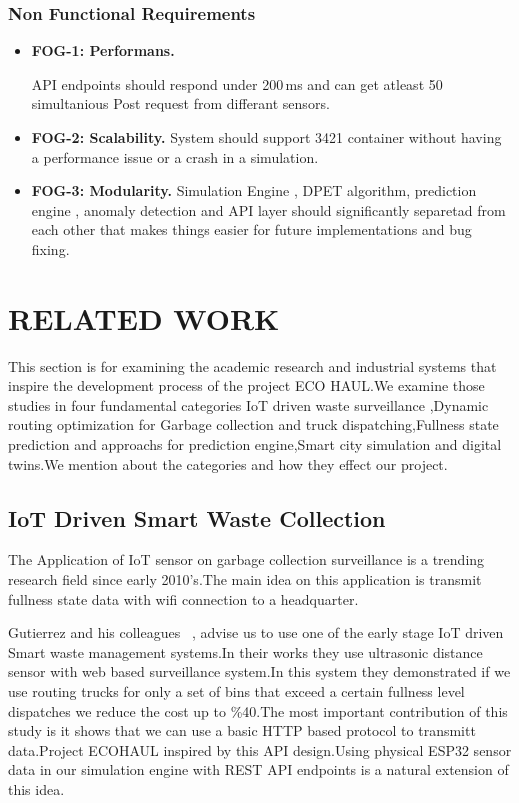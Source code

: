 \documentclass[12pt,a4paper]{report}
\begin{document}
\subsection{Non Functional Requirements}

\begin{itemize}[leftmargin=1.5cm]
  \item \textbf{FOG-1: Performans.}

        \indent API endpoints should respond under 200\,ms and can get atleast 50 simultanious Post request from differant sensors.
        \clearpage
  \item \textbf{FOG-2: Scalability.}
        System should support 3421 container without having a performance issue or a crash in a simulation.
  \item \textbf{FOG-3: Modularity.}
        \indent Simulation Engine , DPET algorithm, prediction engine , anomaly detection and API layer should significantly separetad from each other that makes things easier for future implementations and bug fixing.

\end{itemize}

\chapter{RELATED WORK}

\indent This section is for examining the academic research and industrial systems that inspire the development process of the project ECO HAUL.We examine those studies in four fundamental categories IoT driven waste surveillance ,Dynamic routing optimization for Garbage collection and truck dispatching,Fullness state prediction and approachs for prediction engine,Smart city simulation and digital twins.We mention about the categories and how they effect our project.
\section{IoT Driven Smart Waste Collection}

\indent The Application of IoT sensor on garbage collection surveillance is a trending research field since early 2010's.The main idea on this application is transmit fullness state data with  wifi connection to a headquarter.

\indent Gutierrez and his colleagues ~\cite{gutierrez2015}, advise us to use one of the early stage IoT driven Smart waste  management systems.In their works they use ultrasonic distance sensor with web based surveillance system.In this system they demonstrated if we use routing trucks for only a set of bins that exceed a certain fullness level dispatches we reduce the cost up to  \%40.The most important contribution of this study is it shows that we can use a basic HTTP based protocol to transmitt data.Project ECOHAUL inspired by this API design.Using physical ESP32 sensor data in our simulation engine with REST API endpoints is a natural extension of this idea.
\end{document}
